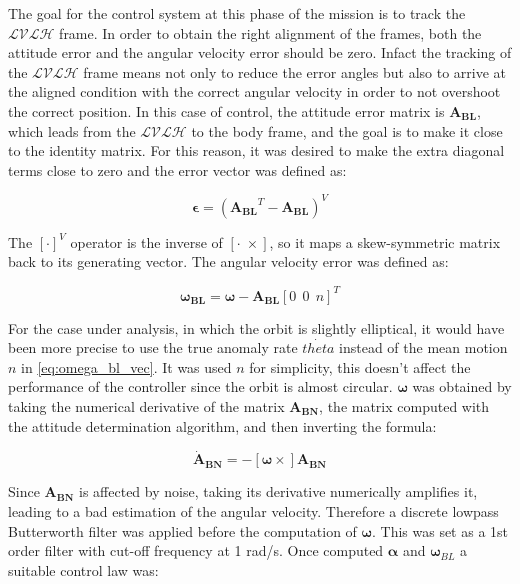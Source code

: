 The goal for the control system at this phase of the mission is to track the $\mathcal{LVLH}$ frame. In order to obtain the right alignment of the frames, both the attitude error and the angular velocity error should be zero. Infact the tracking of the $\mathcal{LVLH}$ frame means not only to reduce the error angles but also to arrive at the aligned condition with the correct angular velocity in order to not overshoot the correct position. In this case of control, the attitude error matrix is $\boldsymbol{A_{BL}}$, which leads from the $\mathcal{LVLH}$ to the body frame, and the goal is to make it close to the identity matrix. For this reason, it was desired to make the extra diagonal terms close to zero and the error vector was defined as:

\begin{equation}
    \boldsymbol{\epsilon}=(\boldsymbol{A_{BL}}^T- \boldsymbol{A_{BL}})^V
\end{equation}

The $[\cdot]^V$ operator is the inverse of $[\cdot \; \times]$, so it maps a skew-symmetric matrix back to its generating vector. 
The angular velocity error was defined as:

\begin{equation}
    \label{eq:omega_bl_vec}
    \boldsymbol{\omega_{BL}}=\boldsymbol{\omega}-\boldsymbol{A_{BL}}[0 \ \ 0 \ \ n]^T
\end{equation}

For the case under analysis, in which the orbit is slightly elliptical, it would have been more precise to use the true anomaly rate $\dot{theta}$ instead of the mean motion $n$ in \autoref{eq:omega_bl_vec}. It was used $n$ for simplicity, this doesn't affect the performance of the controller since the orbit is almost circular.  
$\boldsymbol{\omega}$ was obtained by taking the numerical derivative of the matrix $\boldsymbol{A_{BN}}$, the matrix computed with the attitude determination algorithm, and then inverting the formula:

\begin{equation}
    \boldsymbol{\dot{A}_{BN}} = -[\boldsymbol{\omega} \times] \boldsymbol{A_{BN}}
\end{equation}

Since $\boldsymbol{A_{BN}}$ is affected by noise, taking its derivative numerically amplifies it, leading to a bad estimation of the angular velocity. Therefore a discrete lowpass Butterworth filter was applied before the computation of $\boldsymbol{\omega}$. This was set as a 1st order filter with cut-off frequency at 1 rad/s. Once computed $\boldsymbol{\alpha}$ and $\boldsymbol{\omega}_{BL}$ a suitable control law was:

